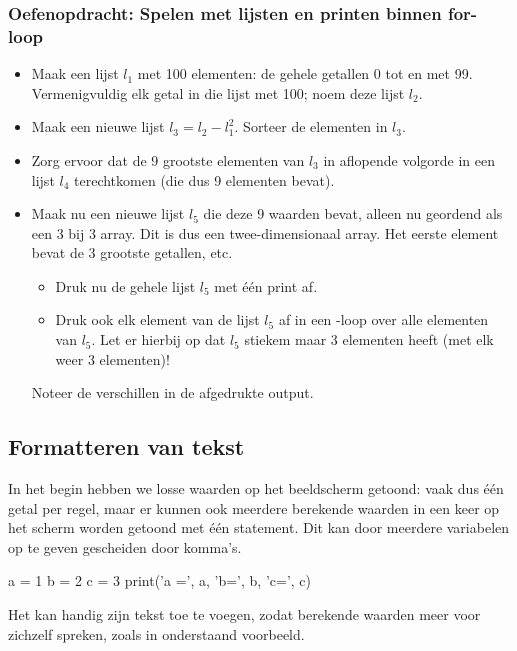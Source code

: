 \documentclass[a4paper,11pt, fleqn]{article}
\begin{document}
\subsubsection*{Oefenopdracht: Spelen met lijsten en printen binnen for-loop} 

\begin{itemize}
\item Maak een  lijst $l_1$ met 100 elementen: de gehele getallen 0 tot en met 99.
Vermenigvuldig elk getal in die lijst met 100; noem deze lijst $l_2$.
\item Maak een nieuwe lijst $ l_3 = l_2 - l_1^2$.
Sorteer de elementen in $l_3$. 
\item Zorg ervoor dat de 9 grootste elementen van $l_3$ in aflopende volgorde in een lijst $l_4$ terechtkomen (die dus 9 elementen bevat).
\item Maak nu een nieuwe lijst $l_5$ die deze 9 waarden bevat, alleen nu geordend als een 3 bij 3 array. Dit is dus een twee-dimensionaal array. Het eerste element bevat de 3 grootste getallen, etc.
 \begin{itemize}
  \item Druk nu de gehele lijst $l_5$ met \'e\'en print af. 
  \item Druk ook elk element van de lijst $l_5$ af in een -loop over alle elementen van $l_5$. Let er hierbij op dat $l_5$ stiekem maar 3 elementen heeft (met elk weer 3 elementen)! 
 \end{itemize}
 Noteer de verschillen in de afgedrukte output. 
\end{itemize}

\subsection{Formatteren van tekst}
\label{sec:format}

In het begin hebben we losse waarden op het beeldscherm getoond: vaak dus \'e\'en getal per regel, maar er kunnen ook meerdere berekende waarden in een keer op het scherm worden getoond met \'e\'en  statement. Dit kan door meerdere variabelen op te geven gescheiden door komma's.

\begin{python}
a = 1
b = 2
c = 3
print('a =', a, 'b=', b, 'c=', c)
\end{python}

Het kan handig zijn tekst toe te voegen, zodat berekende waarden meer voor zichzelf spreken, zoals in onderstaand voorbeeld.
\end{document}
